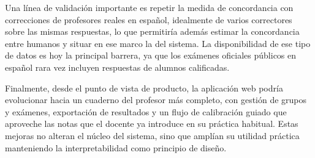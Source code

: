 Una línea de validación importante es repetir la medida de concordancia con correcciones de profesores reales en español, idealmente de varios correctores sobre las mismas respuestas, lo que permitiría además estimar la concordancia entre humanos y situar en ese marco la del sistema. La disponibilidad de ese tipo de datos es hoy la principal barrera, ya que los exámenes oficiales públicos en español rara vez incluyen respuestas de alumnos calificadas.

Finalmente, desde el punto de vista de producto, la aplicación web podría evolucionar hacia un cuaderno del profesor más completo, con gestión de grupos y exámenes, exportación de resultados y un flujo de calibración guiado que aproveche las notas que el docente ya introduce en su práctica habitual. Estas mejoras no alteran el núcleo del sistema, sino que amplían su utilidad práctica manteniendo la interpretabilidad como principio de diseño.
